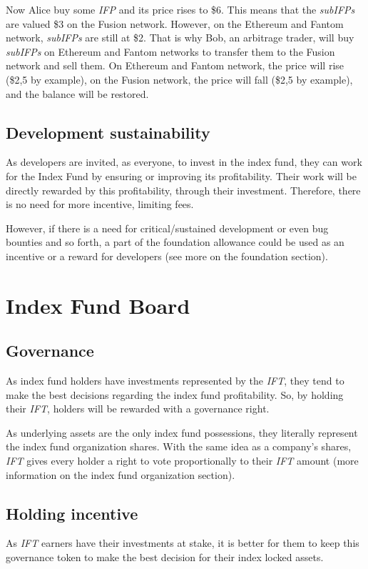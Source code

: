 \documentclass[11pt]{scrartcl}
\begin{document}
    Now Alice buy some \textit{IFP} and its price rises to \$6. This means that
    the \textit{subIFPs} are valued \$3 on the Fusion network. However, on the 
    Ethereum and Fantom network, \textit{subIFPs} are still at \$2. That is why 
    Bob, an arbitrage trader, will buy \textit{subIFPs} on Ethereum and Fantom 
    networks to transfer them to the Fusion network and sell them. On Ethereum 
    and Fantom network, the price will rise (\$2,5 by example), on the Fusion 
    network, the price will fall (\$2,5 by example), and the balance will be 
    restored.

    \subsection{Development sustainability}
    As developers are invited, as everyone, to invest in the index fund, they can 
    work for the Index Fund by ensuring or improving its profitability. Their 
    work will be directly rewarded by this profitability, through their investment.
    Therefore, there is no need for more incentive, limiting fees.

    However, if there is a need for critical/sustained development or even bug
    bounties and so forth, a part of the foundation allowance could be used as
    an incentive or a reward for developers (see more on the foundation section).

    \section{Index Fund Board}

    \subsection{Governance}
    As index fund holders have investments represented by the \textit{IFT},
    they tend to make the best decisions regarding the index fund profitability.
    So, by holding their \textit{IFT}, holders will be rewarded with
    a governance right. 

    As underlying assets are the only index fund possessions, they 
    literally represent the index fund organization shares.
    With the same idea as a company’s shares, \textit{IFT} gives 
    every holder a right to vote proportionally to their \textit{IFT} amount
    (more information on the index fund organization section).
    
    \subsection{Holding incentive}
    As \textit{IFT} earners have their investments at stake,
    it is better for them to keep this governance token to make the best decision
    for their index locked assets.
    
\end{document}
